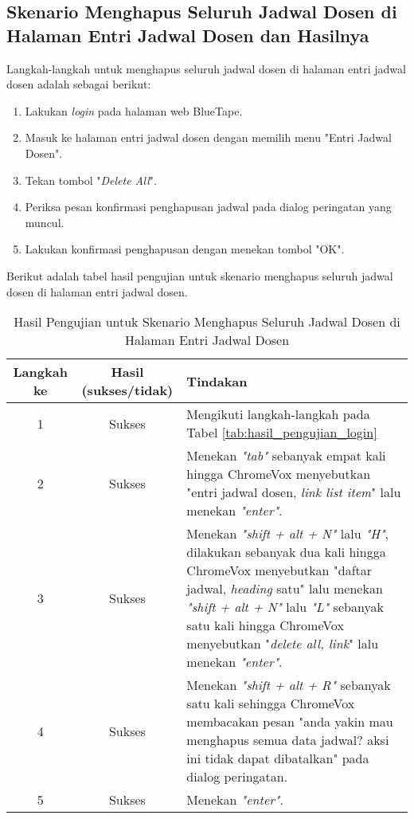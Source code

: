 \subsection{Skenario Menghapus Seluruh Jadwal Dosen di Halaman Entri Jadwal Dosen dan Hasilnya}
\label{subsec:skenario_menghapus_seluruh_jadwal_dosen_di_halaman_entri_jadwal_dosen}
Langkah-langkah untuk menghapus seluruh jadwal dosen di halaman entri jadwal dosen adalah sebagai berikut:

\begin{enumerate}
    \item Lakukan \textit{login} pada halaman web BlueTape.
    \item Masuk ke halaman entri jadwal dosen dengan memilih menu "Entri Jadwal Dosen".
    \item Tekan tombol "\textit{Delete All}".
    \item Periksa pesan konfirmasi penghapusan jadwal pada dialog peringatan yang muncul.
    \item Lakukan konfirmasi penghapusan dengan menekan tombol "OK".
\end{enumerate}

Berikut adalah tabel hasil pengujian untuk skenario menghapus seluruh jadwal dosen di halaman entri jadwal dosen.

\begin{table}[H]
    \centering 
    \caption{Hasil Pengujian untuk Skenario Menghapus Seluruh Jadwal Dosen di Halaman Entri Jadwal Dosen}
    \label{tab:hasil_pengujian_menghapus_seluruh_jadwal_dosen_di_halaman_entri_jadwal_dosen}
    \begin{tabular}{|c|c|p{10cm}|}
        \toprule
        Langkah ke & Hasil (sukses/tidak) & Tindakan \\

        \midrule
        1 & Sukses & Mengikuti langkah-langkah pada Tabel \ref{tab:hasil_pengujian_login} \\
        2 & Sukses & Menekan \textit{"tab"} sebanyak empat kali hingga ChromeVox menyebutkan "entri jadwal dosen, \textit{link list item}" lalu menekan \textit{"enter"}. \\
        3 & Sukses & Menekan \textit{"shift + alt + N"} lalu \textit{"H"}, dilakukan sebanyak dua kali hingga ChromeVox menyebutkan "daftar jadwal, \textit{heading} satu" lalu menekan \textit{"shift + alt + N"} lalu \textit{"L"} sebanyak satu kali hingga ChromeVox menyebutkan "\textit{delete all, link}" lalu menekan \textit{"enter"}. \\
        4 & Sukses & Menekan \textit{"shift + alt + R"} sebanyak satu kali sehingga ChromeVox membacakan pesan "anda yakin mau menghapus semua data jadwal? aksi ini tidak dapat dibatalkan" pada dialog peringatan. \\
        5 & Sukses & Menekan \textit{"enter"}. \\

        \bottomrule

    \end{tabular}
\end{table}

